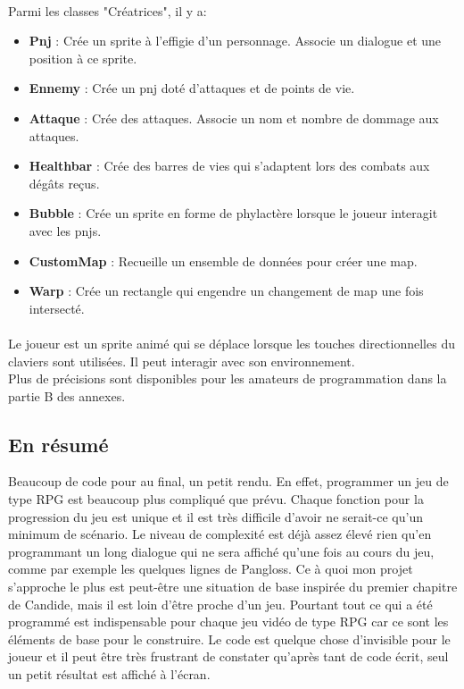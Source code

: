 \documentclass[11pt]{article}
\begin{document}
\paragraph{}
Parmi les classes "Créatrices", il y a: \\

\begin{itemize}
\item \textbf{Pnj} : Crée un sprite à l'effigie d'un personnage. Associe un dialogue et une position à ce sprite.
\item \textbf{Ennemy} : Crée un pnj doté d'attaques et de points de vie.\\
\item \textbf{Attaque} : Crée des attaques. Associe un nom et nombre de dommage aux attaques.
\item \textbf{Healthbar} : Crée des barres de vies qui s'adaptent lors des combats aux dégâts reçus.
\item \textbf{Bubble} : Crée un sprite en forme de phylactère lorsque le joueur interagit avec les pnjs.
\item \textbf{CustomMap} : Recueille un ensemble de données pour créer une map. 
\item \textbf{Warp} : Crée un rectangle qui engendre un changement de map une fois intersecté.
\end{itemize}
\paragraph{}
Le joueur est un sprite animé qui se déplace lorsque les touches directionnelles du claviers sont utilisées. Il peut interagir avec son environnement.\\

Plus de précisions sont disponibles pour les amateurs de programmation dans la partie B des annexes.

\subsection{En résumé}
Beaucoup de code pour au final, un petit rendu. En effet, programmer un jeu de type RPG est beaucoup plus compliqué que prévu. Chaque fonction pour la progression du jeu est unique et il est très difficile d'avoir ne serait-ce qu'un minimum de scénario. Le niveau de complexité est déjà assez élevé rien qu'en programmant un long dialogue qui ne sera affiché qu'une fois au cours du jeu, comme par exemple les quelques lignes de Pangloss. Ce à quoi mon projet s'approche le plus est peut-être une situation de base inspirée du premier chapitre de Candide, mais il est loin d'être proche d'un jeu. Pourtant tout ce qui a été programmé est indispensable pour chaque jeu vidéo de type RPG car ce sont les éléments de base pour le construire. Le code est quelque chose d'invisible pour le joueur et il peut être très frustrant de constater qu'après tant de code écrit, seul un petit résultat est affiché à l'écran. \\
\end{document}
